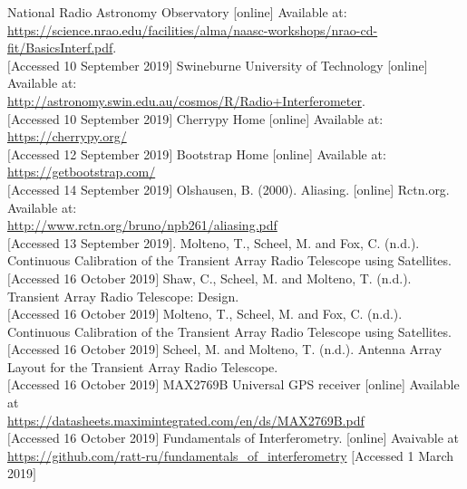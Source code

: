 \newpage
\begin{thebibliography}{9}
National Radio Astronomy Observatory [online] Available at:\\
\url{https://science.nrao.edu/facilities/alma/naasc-workshops/nrao-cd-fit/BasicsInterf.pdf}. \\
$[$Accessed 10 September 2019$]$
Swineburne University of Technology [online] Available at:\\
\url{http://astronomy.swin.edu.au/cosmos/R/Radio+Interferometer}. \\
$[$Accessed 10 September 2019$]$
Cherrypy Home [online] Available at:\\
\url{https://cherrypy.org/}\\
$[$Accessed 12 September 2019$]$
Bootstrap Home [online] Available at:\\
\url{https://getbootstrap.com/}\\
$[$Accessed 14 September 2019$]$
Olshausen, B. (2000). Aliasing. [online] Rctn.org. Available at:\\
\url{http://www.rctn.org/bruno/npb261/aliasing.pdf}\\
$[$Accessed 13 September 2019$]$.
Molteno, T., Scheel, M. and Fox, C. (n.d.). Continuous Calibration of the Transient Array Radio Telescope using Satellites.\\
$[$Accessed 16 October 2019$]$
Shaw, C., Scheel, M. and Molteno, T. (n.d.). Transient Array Radio Telescope: Design.\\
$[$Accessed 16 October 2019$]$
Molteno, T., Scheel, M. and Fox, C. (n.d.). Continuous Calibration of the Transient Array Radio Telescope using Satellites.\\
$[$Accessed 16 October 2019$]$
Scheel, M. and Molteno, T. (n.d.). Antenna Array Layout for the Transient Array Radio Telescope.\\
$[$Accessed 16 October 2019$]$
MAX2769B Universal GPS receiver [online] Available at\\
\url{https://datasheets.maximintegrated.com/en/ds/MAX2769B.pdf}\\
$[$Accessed 16 October 2019$]$
Fundamentals of Interferometry. [online] Avaivable at\\
\url{https://github.com/ratt-ru/fundamentals_of_interferometry}
$[$Accessed 1 March 2019$]$


\end{thebibliography}

